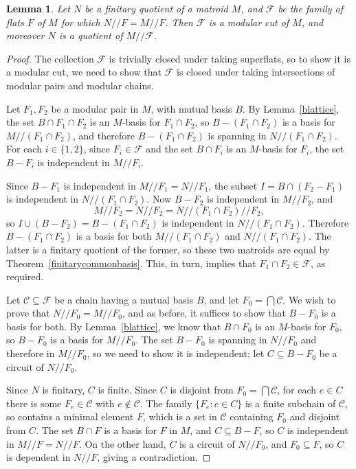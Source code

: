 \documentclass{amsart}
\theoremstyle{plain}
\newtheorem{lemma}[theorem]{Lemma}
\theoremstyle{definition}
\newcommand{\cC}{\mathcal{C}}
\newcommand{\cF}{\mathcal{F}}
\newcommand{\dcon}{/ \!\! /}
\renewcommand{\ss}{\subseteq}
\begin{document}
\begin{lemma}\label{tightquot}
  Let $N$ be a finitary quotient of a matroid $M$, and
  $\cF$ be the family of flats $F$ of $M$ for which $N \dcon F = M \dcon F$. 
  Then $\cF$ is a modular cut of $M$, and moreover $N$ is a quotient of $M \dcon \cF$. 
\end{lemma}
\begin{proof}
  The collection $\cF$ is trivially closed under taking superflats,
  so to show it is a modular cut, 
  we need to show that $\cF$ is closed under taking intersections of modular pairs
  and modular chains. 
  
  Let $F_1, F_2$ be a modular pair in $M$, with mutual basis $B$. 
  By Lemma~\ref{blattice}, the set $B \cap F_1 \cap F_2$ is an $M$-basis for $F_1 \cap F_2$, 
  so $B - (F_1 \cap F_2)$ is a basis for $M \dcon (F_1 \cap F_2)$, 
  and therefore $B - (F_1 \cap F_2)$ is spanning in $N \dcon (F_1 \cap F_2)$. 
  For each $i \in \{1,2\}$, since $F_i \in \cF$ and the set $B \cap F_i$ is an $M$-basis for $F_i$, 
  the set $B - F_i$ is independent in $M \dcon F_i$. 

  Since $B-F_1$ is independent in $M \dcon F_1 = N \dcon F_1$, 
  the subset $I = B \cap (F_2 - F_1)$ is independent in $N \dcon (F_1 \cap F_2)$. 
  Now $B - F_2$ is independent in $M \dcon F_2$, and 
  \[M \dcon F_2 = N \dcon F_2 = N \dcon (F_1 \cap F_2) \dcon F_2,\]
  so $I \cup (B - F_2) = B - (F_1 \cap F_2)$ is independent in $N \dcon (F_1 \cap F_2)$. 
  Therefore $B - (F_1 \cap F_2)$ is a basis for both $M \dcon (F_1 \cap F_2)$ and
  $N \dcon (F_1 \cap F_2)$. The latter is a finitary quotient of the former, 
  so these two matroids are equal by Theorem~\ref{finitarycommonbasis}.
  This, in turn, implies that $F_1 \cap F_2 \in \cF$, as required. 

  Let $\cC \ss \cF$ be a chain having a mutual basis $B$, and let $F_0 = \bigcap \cC$. 
  We wish to prove that $N \dcon F_0 = M \dcon F_0$, and as before, it suffices to 
  show that $B-F_0$ is a basis for both. By Lemma~\ref{blattice}, 
  we know that $B \cap F_0$ is an $M$-basis for $F_0$, so $B-F_0$ is a basis for $M \dcon F_0$. 
  The set $B-F_0$ is spanning in $N \dcon F_0$ and therefore in $M \dcon F_0$, 
  so we need to show it is independent; let $C \ss B - F_0$ be a circuit of $N \dcon F_0$. 

  Since $N$ is finitary, $C$ is finite. Since $C$ is disjoint from $F_0 = \bigcap \cC$, 
  for each $e \in C$ there is some $F_e \in \cC$ with $e \notin \cC$. The family
  $\{F_e : e \in C\}$ is a finite subchain of $\cC$, so contains a minimal element $F$, 
  which is a set in $\cC$ containing $F_0$ and disjoint from $C$. 
  The set $B \cap F$ is a basis for $F$ in $M$, and $C \ss B - F$, 
  so $C$ is independent in $M \dcon F = N \dcon F$.
  On the other hand, $C$ is a circuit of $N \dcon F_0$, and $F_0 \ss F$, 
  so $C$ is dependent in $N \dcon F$, giving a contradiction.


\end{proof}
\end{document}
